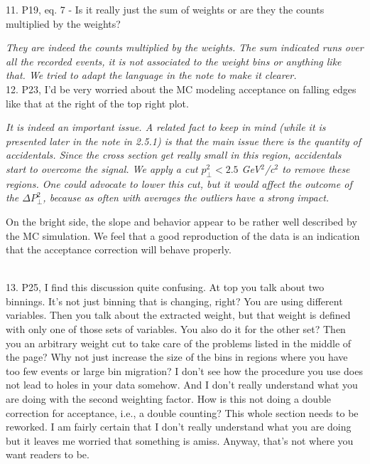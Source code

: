 \documentclass[12pt]{article}
\begin{document}
11.
P19, eq. 7 - Is it really just the sum of weights or are they the counts multiplied by the 
weights?

{\it They are indeed the counts multiplied by the weights.
The sum indicated runs over all the recorded events, it is not associated to the weight
bins or anything like that. We tried to adapt the language in the note to make it clearer.} \\


12.
P23, I’d be very worried about the MC modeling acceptance on falling edges like that at the 
right of the top right plot.

{\it It is indeed an important issue. A related fact to keep in mind (while it is presented 
later in the note in 2.5.1) is that the main issue there is the quantity of accidentals. Since
the cross section get really small in this region, accidentals start to overcome
the signal. We apply a cut
$p_\perp^2 < 2.5$ GeV$^2$/c$^2$ to remove these regions. One could advocate to lower this 
cut, but it would affect the outcome of the $\Delta P_\perp^2$, 
because as often with averages the outliers have a strong impact.

On the bright side, the slope and behavior appear to be rather well described by the MC
simulation. We feel that a good reproduction of the data is an indication that the 
acceptance correction will behave properly.} \\



13.
P25, I find this discussion quite confusing.   At top you talk about two binnings.  It’s not just 
binning that is changing, right?  You are using different variables.  Then you talk about the 
extracted weight, but that weight is defined with only one of those sets of variables.  You 
also do it for the other set?  Then you an arbitrary weight cut to take care of the problems 
listed in the middle of the page?  Why not just increase the size of the bins in regions where 
you have too few events or large bin migration?  I don’t see how the procedure you use 
does not lead to holes in your data somehow.  And I don’t really understand what you are 
doing with the second weighting factor.  How is this not doing a double correction for 
acceptance, i.e., a double counting?  This whole section needs to be reworked.  I am fairly 
certain that I don’t really understand what you are doing but it leaves me worried that 
something is amiss.  Anyway, that’s not where you want readers to be.  
\end{document}
